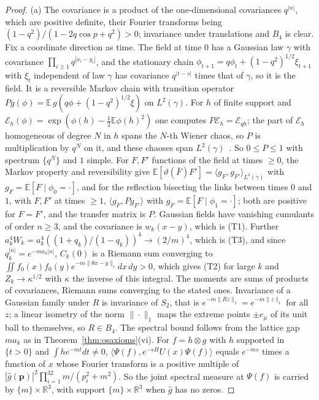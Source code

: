 \documentclass[aps,prd,twocolumn,superscriptaddress,nofootinbib,longbibliography,floatfix,amsmath,amssymb,10pt]{revtex4-2}
\theoremstyle{definition}
\theoremstyle{remark}
\newcommand{\R}{\mathbb{R}}
\newcommand{\E}{\mathbb{E}}
\newcommand{\ip}[2]{\langle #1,#2\rangle}
\begin{document}
\begin{proof}
(a) The covariance is a product of the one-dimensional covariances
$q^{|n|}$, which are positive definite, their Fourier transforms being
$(1-q^2)/(1-2q\cos p+q^2)>0$; invariance under translations and $B_4$ is
clear. Fix a coordinate direction as time. The field at time $0$ has a
Gaussian law $\gamma$ with covariance $\prod_{i\ge1}q^{|x_i-y_i|}$, and the
stationary chain $\phi_{t+1}=q\phi_t+(1-q^2)^{1/2}\xi_{t+1}$ with $\xi_t$
independent of law $\gamma$ has covariance $q^{|t-s|}$ times that of
$\gamma$, so it is the field. It is a reversible Markov chain with
transition operator $Pg(\phi)=\E\,g(q\phi+(1-q^2)^{1/2}\xi)$ on
$L^2(\gamma)$. For $h$ of finite support and $\mathcal E_h(\phi)=
\exp(\phi(h)-\frac12\E\phi(h)^2)$ one computes $P\mathcal E_h=\mathcal
E_{qh}$; the part of $\mathcal E_h$ homogeneous of degree $N$ in $h$ spans
the $N$-th Wiener chaos, so $P$ is multiplication by $q^N$ on it, and these
chaoses span $L^2(\gamma)$~\cite[Sect.~6.3]{GJ87}. So $0\le P\le1$ with
spectrum $\{q^N\}$ and $1$ simple. For $F,F'$ functions of the field at
times $\ge0$, the Markov property and reversibility give
$\E[\vartheta(\bar F)F']=\ip{g_F}{g_{F'}}_{L^2(\gamma)}$ with
$g_F=\E[F\mid\phi_0=\cdot]$, and for the reflection bisecting the links
between times $0$ and $1$, with $F,F'$ at times $\ge1$,
$\ip{g_F}{Pg_{F'}}$ with $g_F=\E[F\mid\phi_1=\cdot]$; both are positive
for $F=F'$, and the transfer matrix is $P$. Gaussian fields have vanishing
cumulants of order $n\ge3$, and the covariance is $w_k(x-y)$, which is
(T1). Further $a_k^4W_k=a_k^4((1+q_k)/(1-q_k))^4\to(2/m)^4$, which is (T3),
and since $q_k^{|n|}=e^{-ma_k|n|}$, $C_k(0)$ is a Riemann sum converging to
$\iint f_0(x)f_0(y)e^{-m\|\theta x-y\|_1}dx\,dy>0$, which gives (T2) for
large $k$ and $Z_k\to\kappa^{1/2}$ with $\kappa$ the inverse of this
integral. The moments are sums of products of covariances, Riemann sums
converging to the stated ones. Invariance of a Gaussian family under $R$ is
invariance of $S_2$, that is $e^{-m\|Rz\|_1}=e^{-m\|z\|_1}$ for all $z$; a
linear isometry of the norm $\|\cdot\|_1$ maps the extreme points $\pm
e_\mu$ of its unit ball to themselves, so $R\in B_4$. The spectral bound
follows from the lattice gap $ma_k$ as in Theorem~\ref{thm:osaxioms}(vi).
For $f=h\otimes g$ with $h$ supported in $\{t>0\}$ and $\int he^{-mt}dt\ne0$,
$\ip{\Psi(f)}{e^{-sH}U(x)\Psi(f)}$ equals $e^{-ms}$ times a function of $x$
whose Fourier transform is a positive multiple of $|\hat g(\mathbf p)|^2
\prod_{i=1}^32m/(p_i^2+m^2)$. So the joint spectral measure at $\Psi(f)$ is
carried by $\{m\}\times\R^3$, with support $\{m\}\times\R^3$ when $\hat g$
has no zeros.


\end{proof}
\end{document}
